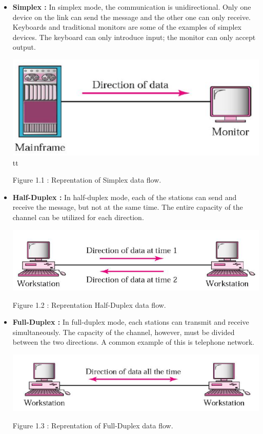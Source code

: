 \documentclass[12pt,a4paper]{article}%
\begin{document}
\begin{flushleft}
		\begin{itemize}
			\item \textbf{Simplex : } In simplex mode, the communication is unidirectional. Only one device on the link can send the message and the other one can only receive. Keyboards and traditional monitors are some of the examples of simplex 		  		devices. The keyboard can only introduce input; the monitor can only accept output.
			\begin{center}
				{\includegraphics[width=0.80 \textwidth]{./images/simplexx.PNG}}tt
			\end{center}
			\begin{center}
				Figure 1.1 : Reprentation of Simplex data flow.
			\end{center}
			\item \textbf{Half-Duplex : } In half-duplex mode, each of the stations can send and receive the message, but not at the same time. The entire capacity of the channel can be utilized for each direction.
			\begin{center}
				{\includegraphics[width=0.80 \textwidth]{./images/half-duplex.PNG}}
			\end{center}
			\begin{center}
				Figure 1.2 : Reprentation Half-Duplex data flow.
			\end{center}
			\item \textbf{Full-Duplex : } In full-duplex mode, each stations can transmit and receive simultaneously. The capacity of the channel, however, must be divided between the two directions. A common example of this is telephone network.
			\begin{center}
				{\includegraphics[width=0.80 \textwidth]{./images/full-duplex.PNG}}
			\end{center}
			\begin{center}
				Figure 1.3 : Reprentation of Full-Duplex data flow.\\\bigskip
			\end{center}
		\end{itemize}
		

\end{flushleft}
\end{document}

